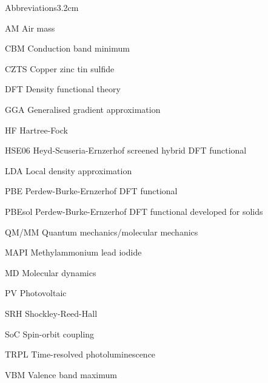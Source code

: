 \begin{mclistof}{Abbreviations}{3.2cm}

\item[AM] Air mass
\item[CBM] Conduction band minimum
\item[CZTS] Copper zinc tin sulfide
\item[DFT] Density functional theory
\item[GGA] Generalised gradient approximation
\item[HF] Hartree-Fock
\item[HSE06] Heyd-Scuseria-Ernzerhof screened hybrid DFT functional 
\item[LDA] Local density approximation
\item[PBE] Perdew-Burke-Ernzerhof DFT functional
\item[PBEsol] Perdew-Burke-Ernzerhof DFT functional developed for solids
\item[QM/MM] Quantum mechanics/molecular mechanics
\item[MAPI] Methylammonium lead iodide
\item[MD] Molecular dynamics
\item[PV] Photovoltaic
\item[SRH] Shockley-Reed-Hall 
\item[SoC] Spin-orbit coupling
\item[TRPL] Time-resolved photoluminescence 
\item[VBM] Valence band maximum

\end{mclistof} 
